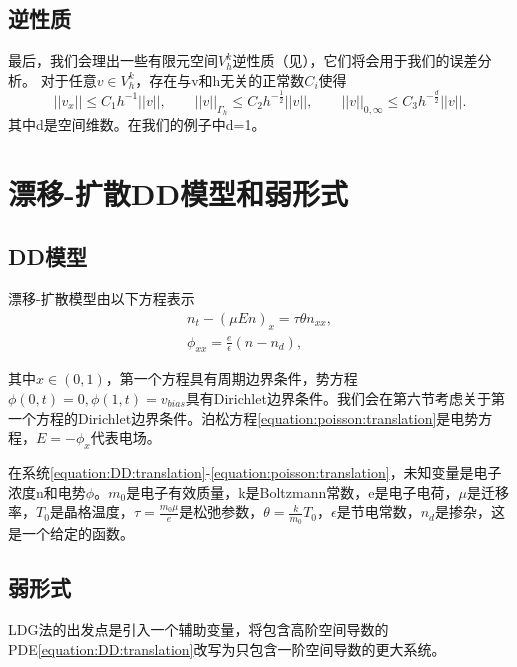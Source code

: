\subsection{逆性质}
最后，我们会理出一些有限元空间$V_h^k$逆性质（见\parencite{ciarlet1978finite}），它们将会用于我们的误差分析。
对于任意$v \in V_h^k$，存在与v和h无关的正常数$C_i$使得
\begin{equation}
    ||v_x|| \leq C_1 h^{-1} ||v||, \qquad
    ||v||_{\Gamma_h} \leq C_2 h^{-\frac{1}{2}}||v||, \qquad
    ||v||_{0,\infty} \leq C_3 h^{-\frac{d}{2}}||v||.
\end{equation}
其中d是空间维数。在我们的例子中d=1。
\section{漂移-扩散DD模型和弱形式}
\subsection{DD模型}
漂移-扩散模型由以下方程表示
\begin{align}
    n_t - (\mu En)_x = \tau \theta n_{xx}, \label{equation:DD:translation} \\
    \phi_{xx} = \frac{e}{\epsilon}(n - n_d),  \label{equation:poisson:translation}
\end{align}

其中$x \in (0,1)$，第一个方程具有周期边界条件，势方程$\phi(0,t) = 0, \phi(1,t) = v_{bias}$具有Dirichlet边界条件。我们会在第六节考虑关于第一个方程的Dirichlet边界条件。泊松方程\eqref{equation:poisson:translation}是电势方程，$E = -\phi_x$代表电场。

在系统\eqref{equation:DD:translation}-\eqref{equation:poisson:translation}，未知变量是电子浓度n和电势$\phi$。$m_0$是电子有效质量，k是Boltzmann常数，e是电子电荷，$\mu$是迁移率，$T_0$是晶格温度，$\tau = \frac{m_0 \mu}{e}$是松弛参数，$\theta = \frac{k}{m_0}T_0$，$\epsilon$是节电常数，$n_d$是掺杂，这是一个给定的函数。
\subsection{弱形式}
LDG法的出发点是引入一个辅助变量，将包含高阶空间导数的PDE\eqref{equation:DD:translation}改写为只包含一阶空间导数的更大系统。


